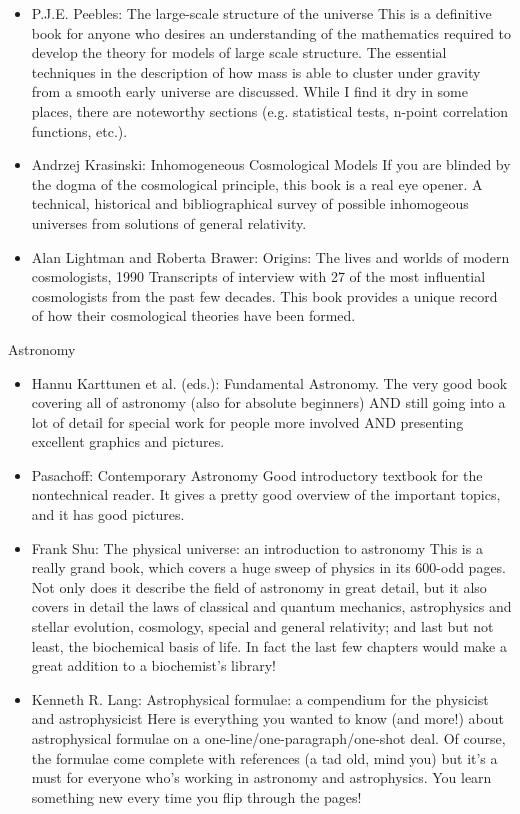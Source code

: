 \documentclass[10pt,a4paper]{book}
\theoremstyle{definition}
\begin{document}
\begin{itemize}
\item P.J.E. Peebles: The large-scale structure of the universe
This is a definitive book for anyone who desires an understanding of the mathematics required to develop the theory for models of large scale structure.  The essential techniques in the description of how mass is able to cluster under gravity from a smooth early universe are discussed.  While I find it dry in some places, there are noteworthy sections (e.g. statistical tests, n-point correlation functions, etc.).
\item Andrzej Krasinski: Inhomogeneous Cosmological Models
If you are blinded by the dogma of the cosmological principle, this book is a real eye opener.  A technical, historical and bibliographical survey of possible inhomogeous universes from solutions of general relativity.
\item Alan Lightman and Roberta Brawer: Origins: The lives and worlds of modern cosmologists, 1990
Transcripts of interview with 27 of the most influential cosmologists from the past few decades.  This book provides a unique record of how their cosmological theories have been formed.
\end{itemize}


Astronomy
\begin{itemize}
\item Hannu Karttunen et al. (eds.): Fundamental Astronomy.
The very good book covering all of astronomy (also for absolute beginners) AND still going into a lot of detail for special work for people more involved AND presenting excellent graphics and pictures.
\item Pasachoff: Contemporary Astronomy
Good introductory textbook for the nontechnical reader.  It gives a pretty good overview of the important topics, and it has good pictures.
\item Frank Shu: The physical universe: an introduction to astronomy
This is a really grand book, which covers a huge sweep of physics in its 600-odd pages.  Not only does it describe the field of astronomy in great detail, but it also covers in detail the laws of classical and quantum mechanics, astrophysics and stellar evolution, cosmology, special and general relativity; and last but not least, the biochemical basis of life.  In fact the last few chapters would make a great addition to a biochemist's library!
\item Kenneth R. Lang: Astrophysical formulae: a compendium for the physicist and astrophysicist
Here is everything you wanted to know (and more!) about astrophysical formulae on a one-line/one-paragraph/one-shot deal.  Of course, the formulae come complete with references (a tad old, mind you) but it's a must for everyone who's working in astronomy and astrophysics.  You learn something new every time you flip through the pages!
\end{itemize}
\end{document}
